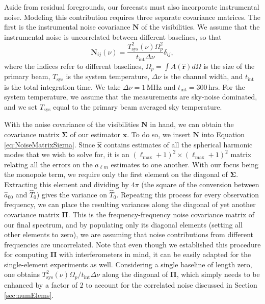 \documentclass[twocolumn,apj,numberedappendix]{emulateapj}
\newcommand{\xhat}{\hat{\mathbf{x}}}
\newcommand{\N}{\mathbf{N}}
\begin{document}
Aside from residual foregrounds, our forecasts must also incorporate instrumental noise. Modeling this contribution requires three separate covariance matrices. The first is the instrumental noise covariance $\N$ of the visibilities. We assume that the instrumental noise is uncorrelated between different baselines, so that
\begin{equation}
\N_{ij} (\nu) = \frac{T^2_\textrm{sys}(\nu) \Omega_p^2}{t_\textrm{int} \Delta \nu} \delta_{ij},
\end{equation}
where the indices refer to different baselines, $\Omega_p = \int  A(\mathbf{\hat{r}}) d\Omega$ is the size of the primary beam, $T_\textrm{sys}$ is the system temperature, $\Delta \nu$ is the channel width, and $t_\textrm{int}$ is the total integration time. We take $\Delta \nu = 1\,\textrm{MHz}$ and $t_\textrm{int} = 300\,\textrm{hrs}$. For the system temperature, we assume that the measurements are sky-noise dominated, and we set $T_\textrm{sys}$ equal to the primary beam averaged sky temperature.

With the noise covariance of the visibilities $\N$ in hand, we can obtain the covariance matrix $\boldsymbol \Sigma$ of our estimator $\xhat$. To do so, we insert $\N$ into Equation \eqref{eq:NoiseMatrixSigma}. Since $\xhat$ contains estimates of all the spherical harmonic modes that we wish to solve for,   it is an $(\ell_\textrm{max} +1)^2 \times (\ell_\textrm{max}+1)^2$ matrix relating all the errors on the $a_{\ell m}$ estimates to one another. With our focus being the monopole term, we require only the first element on the diagonal of $\boldsymbol \Sigma$. Extracting this element and dividing by $4\pi$ (the square of the conversion between $\hat{a}_{00}$ and $\widehat{T}_0$) gives the variance on $\widehat{T}_0$. Repeating this process for every observation frequency, we can place the resulting variances along the diagonal of yet another covariance matrix $\boldsymbol \Pi$. This is the frequency-frequency noise covariance matrix of our final spectrum, and by populating only its diagonal elements (setting all other elements to zero), we are assuming that noise contributions from different frequencies are uncorrelated. Note that even though we established this procedure for computing $\boldsymbol \Pi$ with interferometers in mind, it can be easily adapted for the single-element experiments as well. Considering a single baseline of length zero, one obtains  $T^2_\textrm{sys}(\nu) \Omega_p / t_\textrm{int} \Delta \nu$ along the diagonal of $\boldsymbol \Pi$, which simply needs to be enhanced by a factor of $2$ to account for the correlated noise discussed in Section \ref{sec:numElems}.
\end{document}
